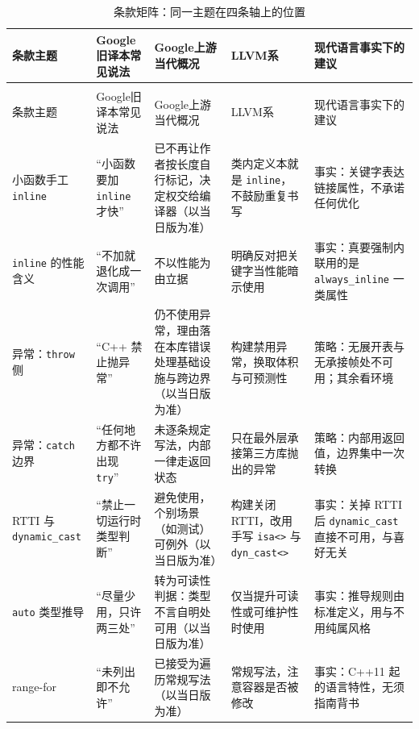 \documentclass[12pt,a4paper,fontset=fandol]{ctexbook}
\newcommand{\cpp}[1]{C++#1}
\newcommand{\Tp}[1]{\texttt{#1}}
\newcommand{\Bk}{\discretionary{}{}{}}
\newcommand{\Lang}[1]{\textsf{#1}}
\newcommand{\CPP}{\Lang{C++}}
\newcommand{\DomGo}{\Lang{Google}}
\newcommand{\DomLlvm}{\Lang{LLVM}}
\begin{document}
{\footnotesize
\begin{longtable}{%
  >{\raggedright\arraybackslash}p{}
  >{\raggedright\arraybackslash}p{}
  >{\raggedright\arraybackslash}p{}
  >{\raggedright\arraybackslash}p{}
  >{\raggedright\arraybackslash}p{}@{}}
  \caption{条款矩阵：同一主题在四条轴上的位置}\label{tab:apx-matrix}\\
  \toprule
  条款主题 & \DomGo 旧译本常见说法 & \DomGo 上游当代概况 & \DomLlvm 系 & 现代语言事实下的建议 \\
  \midrule
  \endfirsthead
  \multicolumn{5}{l}{\footnotesize 表~\ref{tab:apx-matrix}（续）}\\
  \toprule
  条款主题 & \DomGo 旧译本常见说法 & \DomGo 上游当代概况 & \DomLlvm 系 & 现代语言事实下的建议 \\
  \midrule
  \endhead
  \bottomrule
  \endfoot
  小函数手工 \Tp{inline} & ``小函数要加 \Tp{inline} 才快'' &
    已不再让作者按长度自行标记，决定权交给编译器（以当日版为准） &
    类内定义本就是 \Tp{inline}，不鼓励重复书写 &
    事实：关键字表达链接属性，不承诺任何优化 \\
  \Tp{inline} 的性能含义 & ``不加就退化成一次调用'' &
    不以性能为由立据 &
    明确反对把关键字当性能暗示使用 &
    事实：真要强制内联用的是 \Tp{always\_{\Bk}inline} 一类属性 \\
  异常：\Tp{throw} 侧 & ``\CPP{} 禁止抛异常'' &
    仍不使用异常，理由落在本库错误处理基础设施与跨边界（以当日版为准） &
    构建禁用异常，换取体积与可预测性 &
    策略：无展开表与无承接帧处不可用；其余看环境 \\
  异常：\Tp{catch} 边界 & ``任何地方都不许出现 \Tp{try}'' &
    未逐条规定写法，内部一律走返回状态 &
    只在最外层承接第三方库抛出的异常 &
    策略：内部用返回值，边界集中一次转换 \\
  RTTI 与 \Tp{dynamic\_{\Bk}cast} & ``禁止一切运行时类型判断'' &
    避免使用，个别场景（如测试）可例外（以当日版为准） &
    构建关闭 RTTI，改用手写 \Tp{isa<>} 与 \Tp{dyn\_{\Bk}cast<>} &
    事实：关掉 RTTI 后 \Tp{dynamic\_{\Bk}cast} 直接不可用，与喜好无关 \\
  \Tp{auto} 类型推导 & ``尽量少用，只许两三处'' &
    转为可读性判据：类型不言自明处可用（以当日版为准） &
    仅当提升可读性或可维护性时使用 &
    事实：推导规则由标准定义，用与不用纯属风格 \\
  range-for & ``未列出即不允许'' &
    已接受为遍历常规写法（以当日版为准） &
    常规写法，注意容器是否被修改 &
    事实：\cpp{11} 起的语言特性，无须指南背书 \\

\end{longtable}}
\end{document}
